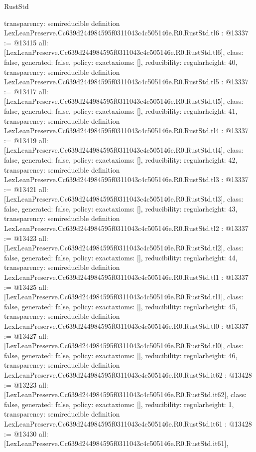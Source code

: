 \begin{lexlean}{RustStd}
\begin{coremodule}
{  transparency: semireducible
}
definition LexLeanPreserve.Cc639d244984595f0311043c4c505146e.R0.RustStd.tl6 : @13337 := @13415 {
  all: [LexLeanPreserve.Cc639d244984595f0311043c4c505146e.R0.RustStd.tl6],
  class: false,
  generated: false,
  policy: exact{axioms: []},
  reducibility: regular{height: 40},
  transparency: semireducible
}
definition LexLeanPreserve.Cc639d244984595f0311043c4c505146e.R0.RustStd.tl5 : @13337 := @13417 {
  all: [LexLeanPreserve.Cc639d244984595f0311043c4c505146e.R0.RustStd.tl5],
  class: false,
  generated: false,
  policy: exact{axioms: []},
  reducibility: regular{height: 41},
  transparency: semireducible
}
definition LexLeanPreserve.Cc639d244984595f0311043c4c505146e.R0.RustStd.tl4 : @13337 := @13419 {
  all: [LexLeanPreserve.Cc639d244984595f0311043c4c505146e.R0.RustStd.tl4],
  class: false,
  generated: false,
  policy: exact{axioms: []},
  reducibility: regular{height: 42},
  transparency: semireducible
}
definition LexLeanPreserve.Cc639d244984595f0311043c4c505146e.R0.RustStd.tl3 : @13337 := @13421 {
  all: [LexLeanPreserve.Cc639d244984595f0311043c4c505146e.R0.RustStd.tl3],
  class: false,
  generated: false,
  policy: exact{axioms: []},
  reducibility: regular{height: 43},
  transparency: semireducible
}
definition LexLeanPreserve.Cc639d244984595f0311043c4c505146e.R0.RustStd.tl2 : @13337 := @13423 {
  all: [LexLeanPreserve.Cc639d244984595f0311043c4c505146e.R0.RustStd.tl2],
  class: false,
  generated: false,
  policy: exact{axioms: []},
  reducibility: regular{height: 44},
  transparency: semireducible
}
definition LexLeanPreserve.Cc639d244984595f0311043c4c505146e.R0.RustStd.tl1 : @13337 := @13425 {
  all: [LexLeanPreserve.Cc639d244984595f0311043c4c505146e.R0.RustStd.tl1],
  class: false,
  generated: false,
  policy: exact{axioms: []},
  reducibility: regular{height: 45},
  transparency: semireducible
}
definition LexLeanPreserve.Cc639d244984595f0311043c4c505146e.R0.RustStd.tl0 : @13337 := @13427 {
  all: [LexLeanPreserve.Cc639d244984595f0311043c4c505146e.R0.RustStd.tl0],
  class: false,
  generated: false,
  policy: exact{axioms: []},
  reducibility: regular{height: 46},
  transparency: semireducible
}
definition LexLeanPreserve.Cc639d244984595f0311043c4c505146e.R0.RustStd.it62 : @13428 := @13223 {
  all: [LexLeanPreserve.Cc639d244984595f0311043c4c505146e.R0.RustStd.it62],
  class: false,
  generated: false,
  policy: exact{axioms: []},
  reducibility: regular{height: 1},
  transparency: semireducible
}
definition LexLeanPreserve.Cc639d244984595f0311043c4c505146e.R0.RustStd.it61 : @13428 := @13430 {
  all: [LexLeanPreserve.Cc639d244984595f0311043c4c505146e.R0.RustStd.it61],
}
\end{coremodule}
\end{lexlean}
